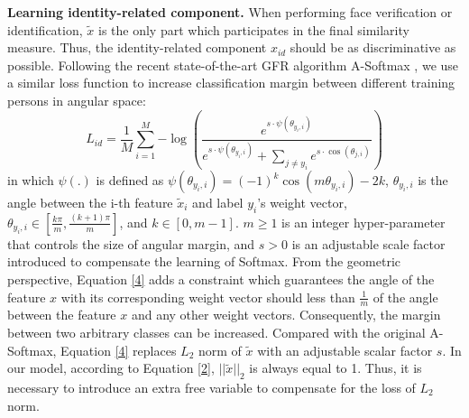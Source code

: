 \documentclass[runningheads]{llncs}
\begin{document}
\textbf{Learning identity-related component.}
When performing face verification or identification, $\tilde x$ is the only  part which participates in the final similarity measure. Thus, the identity-related component $x_{id}$ should be as discriminative as possible. Following the recent state-of-the-art GFR algorithm A-Softmax \cite{sphereface}, we use a similar loss function to increase classification margin between different training persons in angular space:
\begin{equation}\label{4}
{L_{id}} = \frac{1}{{M}}\sum\limits_{i = 1}^M { - \log (\frac{{{e^{s \cdot \psi ({\theta _{{y_i},i}})}}}}{{{e^{s \cdot \psi ({\theta _{{y_i},i}})}} + \sum\nolimits_{j \ne {y_i}} {{e^{s \cdot \cos ({\theta _{j,i}})}}} }})}
\end{equation}
in which $\psi (.)$ is defined as $\psi ({\theta _{{y_i},i}}) = {( - 1)^k}\cos (m{\theta _{{y_i},i}}) - 2k$,
${\theta _{{y_i},i}}$ is the angle between the i-th feature $\tilde x_i$ and label $y_i$'s weight vector, ${\theta _{{y_i},i}} \in [\frac{{k\pi }}{m},\frac{{(k + 1)\pi }}{m}]$, and $k \in [0, m - 1]$. $m \ge 1$ is an integer hyper-parameter that controls the size of angular margin, and $s>0$ is an adjustable scale factor introduced to compensate the learning of Softmax. From the geometric perspective, Equation \ref{4} adds a constraint which guarantees the angle of the feature $x$ with its corresponding weight vector should less than $\frac{1}{m}$ of the angle between the feature $x$ and any other weight vectors. Consequently, the margin between two arbitrary classes can be increased. Compared with the original A-Softmax, Equation \ref{4} replaces $L_2$ norm of $\tilde x$ with an adjustable scalar factor $s$. In our model,  according to Equation \ref{2}, $||\tilde x||_2$ is always equal to 1. Thus, it is necessary to introduce an extra free variable to compensate for the loss of $L_2$ norm.
\end{document}
